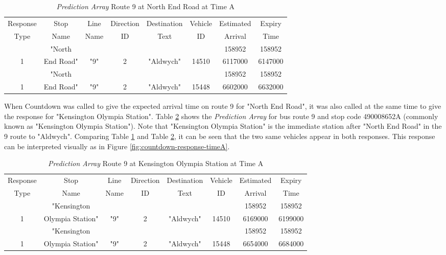 \begin{table}[H]
    \centering
    \setlength\tabcolsep{2pt}
    \begin{tabular}{|c|c|c|c|c|c|c|c|}
        \hline
          Response & Stop   &   Line & Direction & Destination & Vehicle & Estimated & Expiry \\[-3pt]
           Type & Name &    Name & ID &  Text & ID & Arrival &  Time \\
        \hline
             & "North &  &  &  &  & 158952 & 158952 \\[-3pt]
            1 & End Road" & "9" & 2 & "Aldwych" & 14510 & 6117000 & 6147000 \\
        \hline
             & "North &  &  &  &  & 158952 & 158952 \\[-3pt]
            1 & End Road" & "9" & 2 & "Aldwych" & 15448 & 6602000 & 6632000 \\
        \hline
        \end{tabular}
    \caption{\textit{Prediction Array} Route 9 at North End Road at Time A}
    \label{table:prediction-array-stopa}
\end{table}

When Countdown was called to give the expected arrival time on route 9 for "North End Road", it was also called at the same time to give the response for "Kensington Olympia Station". Table \ref{table:prediction-array-stopb} shows the \textit{Prediction Array} for bus route 9 and stop code 490008652A (commonly known as "Kensington Olympia Station"). Note that "Kensington Olympia Station" is the immediate station after "North End Road" in the 9 route to "Aldwych". Comparing Table \ref{table:prediction-array-stopa} and Table \ref{table:prediction-array-stopb}, it can be seen that the two same vehicles appear in both responses. This response can be interpreted visually as in Figure \ref{fig:countdown-response-timeA}.

\begin{table}[H]
    \centering
    \setlength\tabcolsep{2pt}
    \begin{tabular}{|c|c|c|c|c|c|c|c|}
        \hline
          Response & Stop   &   Line & Direction & Destination & Vehicle & Estimated & Expiry \\[-3pt]
            Type & Name &    Name & ID &  Text & ID & Arrival &  Time \\
        \hline
             & "Kensington &  &  &  &  & 158952 & 158952 \\[-3pt]
            1 & Olympia Station" & "9" & 2 & "Aldwych" & 14510 & 6169000 & 6199000 \\
        \hline
             & "Kensington &  &  &  &  & 158952 & 158952 \\[-3pt]
            1 & Olympia Station" & "9" & 2 & "Aldwych" & 15448 & 6654000 & 6684000 \\
        \hline
        \end{tabular}
    \caption{\textit{Prediction Array} Route 9 at Kensington Olympia Station at Time A}
    \label{table:prediction-array-stopb}
\end{table}


